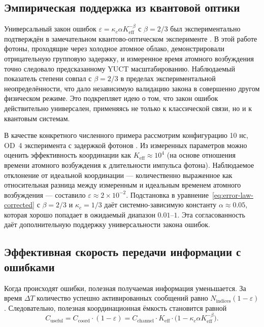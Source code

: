 \documentclass[12pt,a4paper]{article}
\theoremstyle{remark}
\newcommand{\Keff}{K_{\mathrm{eff}}}
\begin{document}
	\subsection{Эмпирическая поддержка из квантовой оптики}
	Универсальный закон ошибок $\varepsilon = \kappa_c \alpha K_{\mathrm{eff}}^{-\beta}$ с $\beta = 2/3$ был экспериментально подтверждён в замечательном квантово-оптическом эксперименте \cite{AppendixS}. В этой работе фотоны, проходящие через холодное атомное облако, демонстрировали отрицательную групповую задержку, и измеренное время атомного возбуждения точно следовало предсказанному YUCT масштабированию. Наблюдаемый показатель степени совпал с $\beta = 2/3$ в пределах экспериментальной неопределённости, что дало независимую валидацию закона в совершенно другом физическом режиме. Это подкрепляет идею о том, что закон ошибок действительно универсален, применяясь не только к классической связи, но и к квантовым системам.
	
	В качестве конкретного численного примера рассмотрим конфигурацию 10 нс, OD~4 эксперимента с задержкой фотонов \cite{AppendixS}. Из измеренных параметров можно оценить эффективность координации как $\Keff \approx 10^4$ (на основе отношения времени атомного возбуждения к длительности импульса фотона). Наблюдаемое отклонение от идеальной координации — количественно выраженное как относительная разница между измеренным и идеальным временем атомного возбуждения — составило $\varepsilon \approx 2\times 10^{-2}$. Подстановка в уравнение~\eqref{eq:error-law-corrected} с $\beta=2/3$ и $\kappa_c=1/3$ даёт системно-зависимую константу $\alpha \approx 0.05$, которая хорошо попадает в ожидаемый диапазон $0.01$–$1$. Эта согласованность даёт дополнительную поддержку универсальности закона ошибок.
	
	\subsection{Эффективная скорость передачи информации с ошибками}
	
	Когда происходят ошибки, полезная получаемая информация уменьшается. За время $\Delta T$ количество успешно активированных сообщений равно $N_{\text{indices}}(1 - \varepsilon)$. Следовательно, полезная координационная ёмкость становится равной
	\begin{equation}
		C_{\text{useful}} = C_{\text{coord}} \cdot (1 - \varepsilon) = C_{\text{channel}} \cdot \Keff \cdot \bigl(1 - \kappa_c \alpha K_{\mathrm{eff}}^{-\beta}\bigr).
		\label{eq:useful-rate}
	\end{equation}
	
\end{document}
